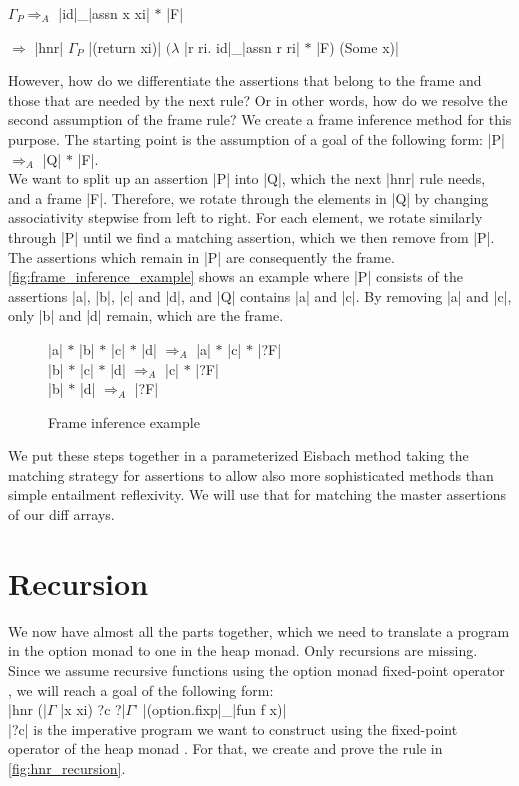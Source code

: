 \begin{samepage}
\noindent $\Gamma_P \Longrightarrow_A$ |id|\_|assn x xi| $*$ |F|

\nopagebreak
\noindent $\Longrightarrow$ |hnr| $\Gamma_P$ |(return xi)| $(\lambda$ |r ri. id|\_|assn r ri| $*$ |F) (Some x)|
\end{samepage}

\noindent However, how do we differentiate the assertions that belong to the frame and those that are needed by the next rule? Or in other words, how do we resolve the second assumption of the frame rule?
We create a frame inference method for this purpose. The starting point is the assumption of a goal of the following form: |P| $\Longrightarrow_A$ |Q| $*$ |F|.\\
We want to split up an assertion |P| into |Q|, which the next |hnr| rule needs, and a frame |F|. Therefore, we rotate through the elements in |Q| by changing associativity stepwise from left to right. For each element, we rotate similarly through |P| until we find a matching assertion, which we then remove from |P|. The assertions which remain in |P| are consequently the frame.\\
\autoref{fig:frame_inference_example} shows an example where |P| consists of the assertions |a|, |b|, |c| and |d|, and |Q| contains |a| and |c|. By removing |a| and |c|, only |b| and |d| remain, which are the frame.

\begin{figure}[htpb]
    \centering
    |a| $*$ |b| $*$ |c| $*$ |d| $\Longrightarrow_A$ |a| $*$ |c| $*$ |?F| \\
            |b| $*$ |c| $*$ |d| $\Longrightarrow_A$ |c| $*$ |?F| \\
                    |b| $*$ |d| $\Longrightarrow_A$ |?F|
    \caption[Frame inference example]{Frame inference example}
    \label{fig:frame_inference_example}
\end{figure}

\noindent We put these steps together in a parameterized Eisbach method taking the matching strategy for assertions to allow also more sophisticated methods than simple entailment reflexivity. We will use that for matching the master assertions of our diff arrays.

\section{Recursion}\label{section:hnr_recursion}

We now have almost all the parts together, which we need to translate a program in the option monad to one in the heap monad. Only recursions are missing. Since we assume recursive functions using the option monad fixed-point operator \parencite[p.5]{Krauss_2010}, we will reach a goal of the following form:\\
|hnr (|$\Gamma$ |x xi) ?c ?|$\Gamma$' |(option.fixp|\_|fun f x)|\\
|?c| is the imperative program we want to construct using the fixed-point operator of the heap monad \parencite[p.8]{Krauss_2010}. For that, we create and prove the rule in \autoref{fig:hnr_recursion}.

